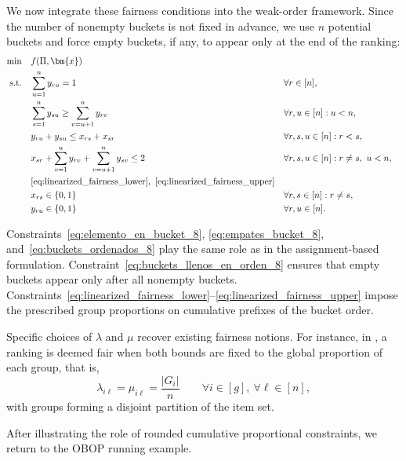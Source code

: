 \documentclass[pdflatex,basic,Numbered]{jnl}%
\theoremstyle{plain}
\theoremstyle{remark}
\theoremstyle{thmstyleone}%
\theoremstyle{thmstylethree}%
\begin{document}
We now integrate these fairness conditions into the weak-order framework. Since the number of nonempty buckets is not fixed in advance, we use \(n\) potential buckets and force empty buckets, if any, to appear only at the end of the ranking:
\begin{subequations}\label{mod:fairness}
    \begin{align}
    \min\quad & f(\Pi,\bm{x})\\
    \text{s.t.}\quad
        & \sum_{u=1}^n y_{ru}=1
        && \forall r\in[n], \label{eq:elemento_en_bucket_8}\\
        & \sum_{s=1}^n y_{su}\ge \sum_{v=u+1}^n y_{rv}
        && \forall r,u\in[n]: u<n, \label{eq:buckets_llenos_en_orden_8}\\
        & y_{ru}+y_{su}\le x_{rs}+x_{sr}
        && \forall r,s,u\in[n]: r<s, \label{eq:empates_bucket_8}\\
        & x_{sr}+\sum_{v=1}^{u}y_{rv}
        +\sum_{v=u+1}^{n}y_{sv}\le 2
        && \forall r,s,u\in[n]: r\neq s,\ u<n, \label{eq:buckets_ordenados_8}\\
        & \eqref{eq:linearized_fairness_lower},\ \eqref{eq:linearized_fairness_upper}\\
        & x_{rs}\in\{0,1\}
        && \forall r,s\in[n]: r\neq s, \label{eq:naturaleza_x_8}\\
        & y_{ru}\in\{0,1\}
        && \forall r,u\in[n]. \label{eq:naturaleza_y_8}
    \end{align}
\end{subequations}

Constraints~\eqref{eq:elemento_en_bucket_8}, \eqref{eq:empates_bucket_8}, and~\eqref{eq:buckets_ordenados_8} play the same role as in the assignment-based formulation. Constraint~\eqref{eq:buckets_llenos_en_orden_8} ensures that empty buckets appear only after all nonempty buckets. Constraints~\eqref{eq:linearized_fairness_lower}--\eqref{eq:linearized_fairness_upper} impose the prescribed group proportions on cumulative prefixes of the bucket order.

Specific choices of \(\lambda\) and \(\mu\) recover existing fairness notions. For instance, in \cite{wei2022rank}, a ranking is deemed fair when both bounds are fixed to the global proportion of each group, that is,
\[
\lambda_{i\ell}=\mu_{i\ell}=\frac{|G_i|}{n}
\qquad \forall i\in[g],\ \forall \ell\in[n],
\]
with groups forming a disjoint partition of the item set.

After illustrating the role of rounded cumulative proportional constraints, we return to the OBOP running example.
\end{document}
